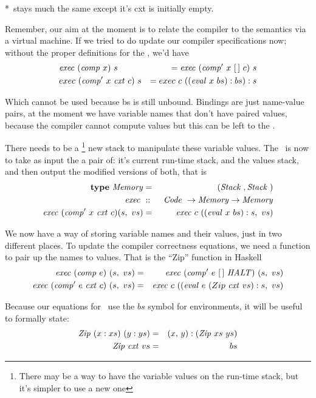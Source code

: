 \documentclass {article}
\begin{document}
*\comp\ stays much the same except it's cxt
	is initially empty.

Remember, our aim at the moment
is to relate the compiler to the
semantics via a virtual machine.
If we tried to do update our compiler 
specifications now; 
without the proper definitions
for the \vm, we'd have
\begin{eqnarray*}
&\mathit{exec\ } (\mathit{comp\ } x)\ s  
	&= \mathit{exec\ } (\mathit{comp'\ }  x\ [\,]\ c)\ s  \\
&exec\ (\mathit{comp'\ }  x\ \mathit{cxt\ } c)\ s  
	&= exec\ c\ ((\mathit{eval\ }  x\ bs) : bs) : s
\end{eqnarray*}

Which cannot be used
because bs is still unbound.
Bindings are just name-value pairs,
at the moment we have variable names
that don't have paired values,
because the compiler cannot compute values
but this can be left to the \vm.

There needs to be a \footnote{
There may be a way to have the variable values
on the run-time stack, but it's
simpler to use a new one}
new stack to
manipulate these variable values.
The \vm\ is now to take as input
the a pair of:
it's current run-time stack,
and the values stack,
and then output the modified versions of both,
\newcommand{\meme}{\mathit{Memory}}
that is
\begin{eqnarray}
\textbf{type}\ \meme &=& (\Stack, \Stack)\nonumber \\
\Exec &::&\ \Code \rightarrow \meme \rightarrow \meme \nonumber \\
\Exec (\Compp  x\ \cxtm c) (s,\ vs) 
	&=& \Exec c\ ((\evalf  x\ bs):s,\ vs) \label{spec4}
\end{eqnarray}

We now have a way of storing variable names
and their values, 
just in two different places.
To update the compiler correctness equations,
we need a function to pair up the names
to values.
That is the ``Zip'' function in Haskell
\begin{eqnarray}
\mathit{exec\ } (\mathit{comp\ } e)\ (s,\ vs) 
		&=& \mathit{exec\ } (\mathit{comp'\ }  e\ [\,]\ \mathit{HALT})\ (s,\ vs) \\
\mathit{exec\ } (\mathit{comp'\ }  e\ \mathit{cxt\ } c)\ (s,\ vs) 
		&=& \mathit{exec\ } c\ ((\mathit{eval\ }  e\ (Zip\ \mathit{cxt\ } vs):s,\ vs)	
\end{eqnarray}

\newcommand{\Zip}{\mathit{Zip\ }}
\newcommand{\zip}{\textit{Zip}}
Because our equations for \eval\  
use the $bs$ symbol for environments,
it will be useful to formally state:
\begin{eqnarray}
\Zip (x:xs)\ (y:ys) &=& (x,\, y):(\Zip xs\ ys)  \\ \label{ziden}
\Zip \cxtm vs &=& bs \label{zcxtvs}
\end{eqnarray}
	
\end{document}
